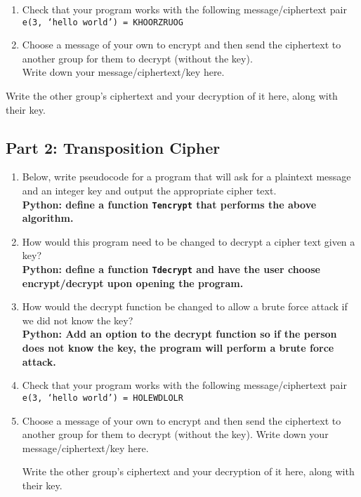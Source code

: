 \documentclass[11pt]{article}
\begin{document}
\begin{enumerate}
\item	Check that your program works with the following message/ciphertext pair
\texttt{e(3, `hello world') = KHOORZRUOG}

\item	Choose a message of your own to encrypt and then send the ciphertext to another group for them to decrypt (without the key). \\
Write down your message/ciphertext/key here.
\end{enumerate}


Write the other group's ciphertext and your decryption of it here, along with their key.


\newpage
\subsection*{Part 2: Transposition Cipher}
\begin{enumerate}
\item	Below, write pseudocode for a program that will ask for a plaintext message and an integer key and output the appropriate cipher text. \\
\textbf{Python: define a function \texttt{Tencrypt} that performs the above algorithm.}












\item	How would this program need to be changed to decrypt a cipher text given a key? \\
\textbf{Python: define a function \texttt{Tdecrypt} and have the user choose encrypt/decrypt upon opening the program.}

\item	How would the decrypt function be changed to allow a brute force attack if we did not know the key? \\
\textbf{Python: Add an option to the decrypt function so if the person does not know the key, the program will perform a brute force attack.}

\item	Check that your program works with the following message/ciphertext pair
\texttt{e(3, `hello world') = HOLEWDLOLR}

\item	Choose a message of your own to encrypt and then send the ciphertext to another group for them to decrypt (without the key). 
Write down your message/ciphertext/key here.


Write the other group's ciphertext and your decryption of it here, along with their key.
\end{enumerate}
\end{document}
